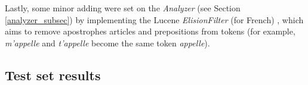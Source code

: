 Lastly, some minor adding were set on the \textit{Analyzer} (see Section \ref{analyzer_subsec}) by implementing the Lucene \textit{ElisionFilter} (for French) \cite{luceneelisionfilter}, which aims to remove apostrophes articles and prepositions from tokens (for example, \textit{m'appelle} and \textit{t'appelle} become the same token \textit{appelle}).


\subsection{Test set results}
\label{subsec:results_submission}


\pagebreak
